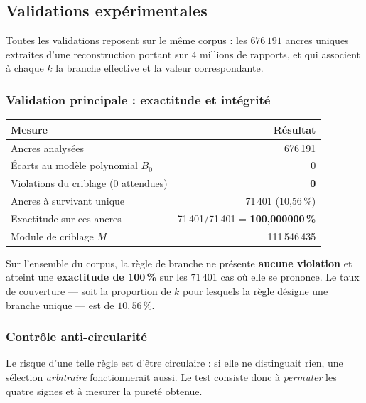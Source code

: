 \subsection{Validations expérimentales}

Toutes les validations reposent sur le même corpus : les
$676\,191$ ancres uniques extraites d'une reconstruction portant sur
$4$ millions de rapports, et qui associent à chaque $k$ la branche
effective et la valeur correspondante.

\subsubsection{Validation principale : exactitude et intégrité}

\begin{center}
\small
\begin{tabular}{@{}l r@{}}
\toprule
\rowcolor{spectralgris}
Mesure & Résultat \\
\midrule
Ancres analysées & 676\,191 \\
Écarts au modèle polynomial $B_0$ & 0 \\
Violations du criblage (0 attendues) & \textbf{0} \\
Ancres à survivant unique & 71\,401 \quad (10{,}56\,\%) \\
Exactitude sur ces ancres & 71\,401/71\,401 \;=\; \textbf{100{,}000000\,\%} \\
Module de criblage $M$ & 111\,546\,435 \\
\bottomrule
\end{tabular}
\end{center}

\begin{boiteformule}
Sur l'ensemble du corpus, la règle de branche ne présente
\textbf{aucune violation} et atteint une \textbf{exactitude de
100\,\%} sur les $71\,401$ cas où elle se prononce. Le taux de
couverture --- soit la proportion de $k$ pour lesquels la règle désigne
une branche unique --- est de $10{,}56\,\%$.
\end{boiteformule}

\subsubsection{Contrôle anti-circularité}

Le risque d'une telle règle est d'être circulaire : si elle ne
distinguait rien, une sélection \emph{arbitraire} fonctionnerait aussi.
Le test consiste donc à \emph{permuter} les quatre signes et à mesurer
la pureté obtenue.

